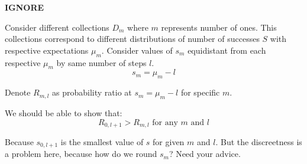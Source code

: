 \documentclass[11pt,draft]{article}
\begin{document}
\clearpage
\textbf{IGNORE}

Consider different collections $D_m$ where $m$ represents number of ones.   
This collections correspond to different distributions of number of successes $S$ with respective expectations $\mu_m$.
Consider values of $s_m$ equidistant from each respective $\mu_m$ by same number of steps $l$.
\[ s_m = \mu_m - l\]

Denote $R_{m,l}$ as probability ratio at $s_m=\mu_m-l$ for specific $m$.

We should be able to show that:
\[ R_{0,l+1} > R_{m,l}  \text{ for any } m \text{ and } l \]

Because $s_{0,l+1}$ is the smallest value of $s$ for given $m$ and $l$.  But the discreetness is a problem here, because how do we round $s_m$?
Need your advice.
\end{document}
